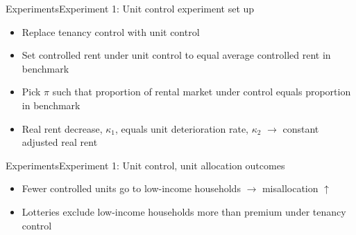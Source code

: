 \documentclass[11pt,aspectratio=169]{beamer}
\begin{document}
\begin{frame}{Experiments}{Experiment 1: Unit control experiment set up}

    \begin{itemize}
    \item Replace tenancy control with unit control
    \item Set controlled rent under unit control to equal average controlled rent in benchmark
    \item Pick $\pi$ such that proportion of rental market under control equals proportion in benchmark
    \item Real rent decrease, $\kappa_{1}$, equals unit deterioration rate, $\kappa_{2}$ $\rightarrow$ constant adjusted real rent
    \end{itemize}

\end{frame}

\begin{frame}{Experiments}{Experiment 1: Unit control, unit allocation outcomes}

\centering
     

\begin{itemize}
    \item Fewer controlled units go to low-income households $\rightarrow$ misallocation $\uparrow$
    \item Lotteries exclude low-income households more than premium under tenancy control
\end{itemize}

\end{frame}
\end{document}
